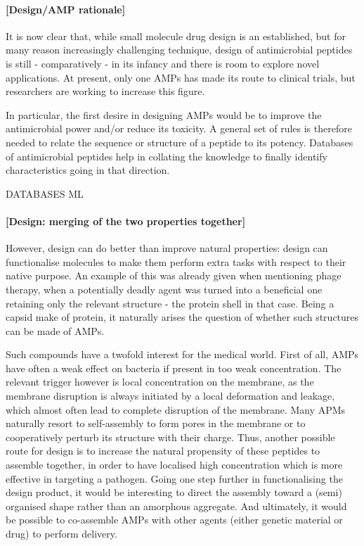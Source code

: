 \documentclass[a4paper,11pt]{extreport}
\begin{document}
\paragraph{[Design/AMP rationale]}
It is now clear that, while small molecule drug design is an established, but for many reason increasingly challenging technique, design of antimicrobial peptides is still - comparatively - in its infancy and there is room to explore novel applications. At present, only one AMPs has made its route to clinical trials, but researchers are working to increase this figure.

In particular, the first desire in designing AMPs would be to improve the antimicrobial power and/or reduce its toxicity. A general set of rules is therefore needed to relate the sequence or structure of a peptide to its potency. Databases of antimicrobial peptides help in collating the knowledge to finally identify characteristics going in that direction.

DATABASES ML


\paragraph{[Design: merging of the two properties together]}
However, design can do better than improve natural properties: design can functionalise molecules to make them perform extra tasks with respect to their native purpose. An example of this was already given when mentioning phage therapy, when a potentially deadly agent was turned into a beneficial one retaining only the relevant structure - the protein shell in that case. Being a capsid make of protein, it naturally arises the question of whether such structures can be made of AMPs.

Such compounds have a twofold interest for the medical world. First of all, AMPs have often a weak effect on bacteria if present in too weak concentration. The relevant trigger however is local concentration on the membrane, as the membrane disruption is always initiated by a local deformation and leakage, which almost often lead to complete disruption of the membrane. Many APMs naturally resort to self-assembly to form pores in the membrane or to cooperatively perturb its structure with their charge. Thus, another possible route for design is to increase the natural propensity of these peptides to assemble together, in order to have localised high concentration which is more effective in targeting a pathogen. Going one step further in functionalising the design product, it would be interesting to direct the assembly toward a (semi) organised shape rather than an amorphous aggregate. And ultimately, it would be possible to co-assemble AMPs with other agents (either genetic material or drug) to perform delivery.
\end{document}
